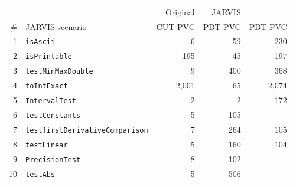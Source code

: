  \begin{tabular*}{\linewidth}{@{\hspace{\tabcolsep}\extracolsep{\fill}}rlrrr}
  \toprule
   &  & Original & JARVIS & \ToolTeralizer{} \\
  \# & JARVIS scenario & CUT PVC & PBT PVC & PBT PVC \\
  \midrule
  1 & \texttt{isAscii} & 6 & 59 & 230 \\
  2 & \texttt{isPrintable} & 195 & 45 & 197 \\
  3 & \texttt{testMinMaxDouble} & 9 & 400 & 368 \\
  4 & \texttt{toIntExact} & 2,001 & 65 & 2,074 \\
  5 & \texttt{IntervalTest} & 2 & 2 & 172 \\
  6 & \texttt{testConstants} & 5 & 105 & -- \\
  7 & \texttt{testfirstDerivativeComparison} & 7 & 264 & 105 \\
  8 & \texttt{testLinear} & 5 & 160 & 104 \\
  9 & \texttt{PrecisionTest} & 8 & 102 & -- \\
  10 & \texttt{testAbs} & 5 & 506 & -- \\
  \bottomrule
  \end{tabular*}
